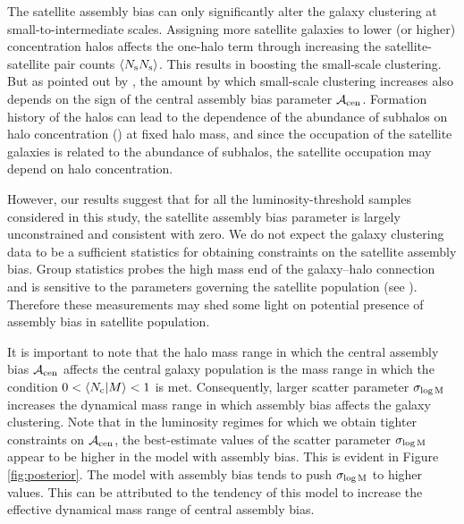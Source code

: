 \documentclass[twocolumn]{aastex61}
\newcommand{\sigmam}{\sigma_{\log \rm M}}
\newcommand{\acen}{\mathcal{A}_{\rm cen}}
\begin{document}
The satellite assembly bias can only significantly alter the galaxy clustering at small-to-intermediate scales. Assigning more satellite galaxies to lower (or higher) concentration halos affects the one-halo term through increasing the satellite-satellite pair counts $\langle N_{\rm s} N_{\rm s} \rangle$. This results in boosting the small-scale clustering. But as pointed out by \citet{decorated}, the amount by which small-scale clustering increases also depends on the sign of the central assembly bias parameter $\acen$. Formation history of the halos can lead to the dependence of the abundance of subhalos on halo concentration (\citealt{zentner2005, mao2015}) at fixed halo mass, and since the occupation of the satellite galaxies is related to the abundance of subhalos, the satellite occupation may depend on halo concentration. 

However, our results suggest that for all the luminosity-threshold samples considered in this study, the satellite assembly bias parameter is largely unconstrained and consistent with zero. We do not expect the galaxy clustering data to be a sufficient statistics for obtaining constraints on the satellite assembly bias. Group statistics probes the high mass end of the galaxy--halo connection and is sensitive to the parameters governing the satellite population (see \citealt{sham_gmf, 2016arXiv160701782H}). Therefore these measurements may shed some light on potential presence of assembly bias in satellite population.   

It is important to note that the halo mass range in which the central assembly bias $\acen$ affects the central galaxy population is the mass range in which the condition $0<\langle N_{\rm c}|M \rangle<1$ is met. Consequently, larger scatter parameter $\sigmam$ increases the dynamical mass range in which assembly bias affects the galaxy clustering. Note that in the luminosity regimes for which we obtain tighter constraints on $\acen$, the best-estimate values of the scatter parameter $\sigmam$ appear to be higher in the model with assembly bias. This is evident in Figure \ref{fig:posterior}. The model with assembly bias tends to push $\sigmam$ to higher values. This can be attributed to the tendency of this model to increase the effective dynamical mass range of central assembly bias.
\end{document}

